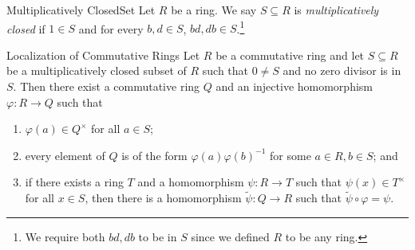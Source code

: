 \documentclass[pmath347]{subfiles}
\begin{document}
    \begin{definition}{Multiplicatively Closed}{Set}
        Let $R$ be a ring. We say $S\subseteq R$ is \emph{multiplicatively closed} if $1\in S$ and for every $b,d\in S$, $bd,db\in S$.\footnote{We require both $bd,db$ to be in $S$ since we defined $R$ to be any ring.}
    \end{definition}

    \begin{theorem}{Localization of Commutative Rings}
        Let $R$ be a commutative ring and let $S\subseteq R$ be a multiplicatively closed subset of $R$ such that $0\neq S$ and no zero divisor is in $S$. Then there exist a commutative ring $Q$ and an injective homomorphism $\varphi:R\to Q$ such that
        \begin{enumerate}
            \item $\varphi\left( a \right) \in Q^\times$ for all $a\in S$;
            \item every element of $Q$ is of the form $\varphi\left( a \right) \varphi\left( b \right) ^{-1}$ for some $a\in R, b\in S$; and
            \item if there exists a ring $T$ and a homomorphism $\psi:R\to T$ such that $\psi\left( x \right) \in T^\times$ for all $x\in S$, then there is a homomorphism $\tilde{\psi}:Q\to R$ such that $\tilde{\psi} \circ\varphi = \psi$. 
        \end{enumerate}
    \end{theorem}
\end{document}
